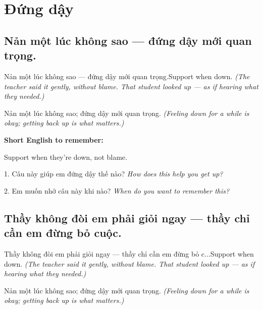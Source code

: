 \chapter{Đứng dậy}


\section{Nản một lúc không sao — đứng dậy mới quan trọng.}
\begin{truyen}{Nản một lúc không sao — đứng dậy mới quan trọng.}{Support when down.}
\textit{(The teacher said it gently, without blame. That student looked up — as if hearing what they needed.)}
\end{truyen}

\begin{baihoc}
Nản một lúc không sao; đứng dậy mới quan trọng.
\textit{(Feeling down for a while is okay; getting back up is what matters.)}
\end{baihoc}

\begin{ghinhoanh}
\textbf{Short English to remember:}

Support when they're down, not blame.

\end{ghinhoanh}

\begin{tuhocnhanh}
1. Câu này giúp em đứng dậy thế nào? \textit{How does this help you get up?}

2. Em muốn nhớ câu này khi nào? \textit{When do you want to remember this?}
\end{tuhocnhanh}
\ngancach


\section{Thầy không đòi em phải giỏi ngay — thầy chỉ cần em đừng bỏ cuộc.}
\begin{truyen}{Thầy không đòi em phải giỏi ngay — thầy chỉ cần em đừng bỏ c...}{Support when down.}
\textit{(The teacher said it gently, without blame. That student looked up — as if hearing what they needed.)}
\end{truyen}

\begin{baihoc}
Nản một lúc không sao; đứng dậy mới quan trọng.
\textit{(Feeling down for a while is okay; getting back up is what matters.)}
\end{baihoc}

